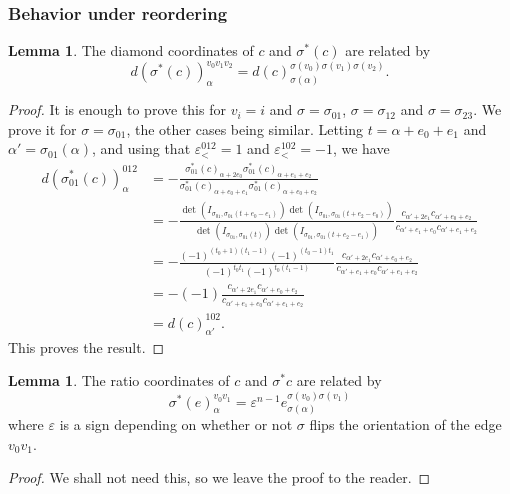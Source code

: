 \documentclass[12pt]{amsart}
\theoremstyle{definition}
\newtheorem{lemma}[theorem]{Lemma}
\numberwithin{equation}{section}
\begin{document}
\subsubsection{Behavior under reordering}
\begin{lemma} The diamond coordinates of $c$ and $\sigma^*(c)$ are related by
\begin{equation}
d(\sigma^*(c))_{\alpha}^{v_0v_1v_2}=d(c)_{\sigma(\alpha)}^{\sigma(v_0)\sigma(v_1)\sigma(v_2)}.
\end{equation}
\end{lemma}
\begin{proof}
It is enough to prove this for $v_i=i$ and $\sigma=\sigma_{01}$, $\sigma=\sigma_{12}$ and $\sigma=\sigma_{23}$. We prove it for $\sigma=\sigma_{01}$, the other cases being similar. Letting $t=\alpha+e_0+e_1$ and $\alpha'=\sigma_{01}(\alpha)$, and using that $\varepsilon_<^{012}=1$ and $\varepsilon_<^{102}=-1$, we have
\begin{equation}
\begin{aligned}
d(\sigma_{01}^*(c))^{012}_\alpha&=-\frac{\sigma_{01}^*(c)_{\alpha+2e_0}\sigma_{01}^*(c)_{\alpha+e_1+e_2}}{\sigma_{01}^*(c)_{\alpha+e_0+e_1}\sigma_{01}^*(c)_{\alpha+e_0+e_2}}\\
&=-\frac{\det(I_{\sigma_{01},\sigma_{01}(t+e_0-e_1)})\det(I_{\sigma_{01},\sigma_{01}(t+e_2-e_0)})}{\det(I_{\sigma_{01},\sigma_{01}(t)})\det(I_{\sigma_{01},\sigma_{01}(t+e_2-e_1)})}\frac{c_{\alpha'+2e_1}c_{\alpha'+e_0+e_2}}{c_{\alpha'+e_1+e_0}c_{\alpha'+e_1+e_2}}\\
&=-\frac{(-1)^{(t_0+1)(t_1-1)}(-1)^{(t_0-1)t_1}}{(-1)^{t_0t_1}(-1)^{t_0(t_1-1)}}\frac{c_{\alpha'+2e_1}c_{\alpha'+e_0+e_2}}{c_{\alpha'+e_1+e_0}c_{\alpha'+e_1+e_2}}\\
&=-(-1)\frac{c_{\alpha'+2e_1}c_{\alpha'+e_0+e_2}}{c_{\alpha'+e_1+e_0}c_{\alpha'+e_1+e_2}}\\
&=d(c)_{\alpha'}^{102}.
\end{aligned}
\end{equation}
This proves the result.
\end{proof}

\begin{lemma}
The ratio coordinates of $c$ and $\sigma^*c$ are related by
\begin{equation}
\sigma^*(e)^{v_0v_1}_{\alpha}= \varepsilon^{n-1} e^{\sigma(v_0)\sigma(v_1)}_{\sigma(\alpha)}
\end{equation}
where $\varepsilon$ is a sign depending on whether or not $\sigma$ flips the orientation of the edge $v_0v_1$. 
\end{lemma}
\begin{proof}
We shall not need this, so we leave the proof to the reader.
\end{proof}
\end{document}
